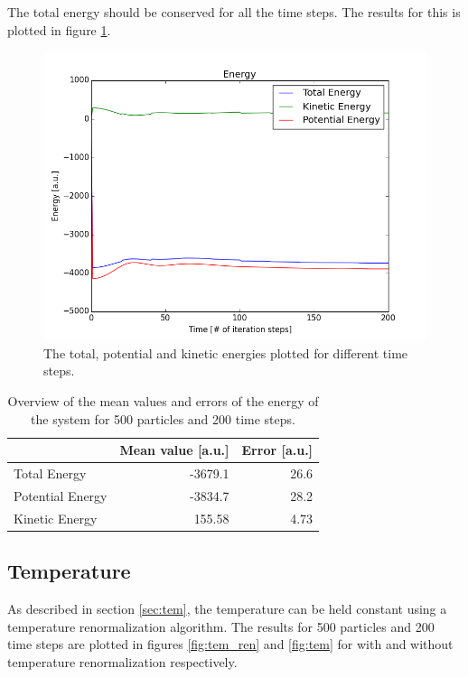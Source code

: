 \documentclass[a4paper,twoside,12pt]{article}
\begin{document}
\noindent The total energy should be conserved for all the time steps. The results for this is plotted in figure \ref{fig:energy}.

\begin{figure}[h]
\centering
\includegraphics[scale=0.5]{figures/Energies_500}
\caption{The total, potential and kinetic energies plotted for different time steps.}
\label{fig:energy}
\end{figure}

\begin{table}
\centering
\caption{Overview of the mean values and errors of the energy of the system for 500 particles and 200 time steps.}
\begin{tabular}{|l|r|r|}
\hline
 & Mean value [a.u.] & Error [a.u.] \\
 \hline
Total Energy & -3679.1 & 26.6  \\
Potential Energy & -3834.7 & 28.2 \\
Kinetic Energy & 155.58 & 4.73 \\
\hline
\end{tabular}
\label{tab:energy}
\end{table}

\subsection{Temperature}

\noindent As described in section \ref{sec:tem}, the temperature can be held constant using a temperature renormalization algorithm. The results for 500 particles and 200 time steps are plotted in figures \ref{fig:tem_ren} and \ref{fig:tem} for with and without temperature renormalization respectively.
\vspace{5mm}
\end{document}
